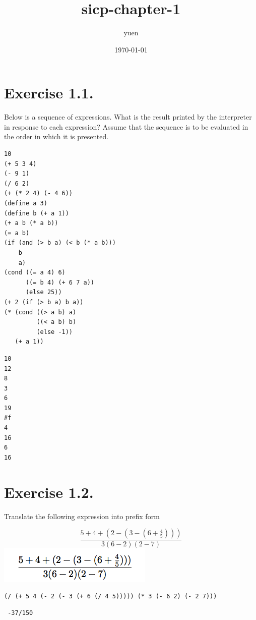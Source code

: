 \documentclass[11pt]{article}
\title{sicp-chapter-1}
\author{yuen}
\date{\today}
\begin{document}
\maketitle

\setcounter{tocdepth}{3}
\tableofcontents
\vspace*{1cm}
\section{Exercise 1.1.}
\label{sec-1}


  Below is a sequence of expressions. What is the result printed by the
  interpreter in response to each expression? Assume that the sequence is
  to be evaluated in the order in which it is presented.


\begin{verbatim}
10
(+ 5 3 4)
(- 9 1)
(/ 6 2)
(+ (* 2 4) (- 4 6))
(define a 3)
(define b (+ a 1))
(+ a b (* a b))
(= a b)
(if (and (> b a) (< b (* a b)))
    b
    a)
(cond ((= a 4) 6)
      ((= b 4) (+ 6 7 a))
      (else 25))
(+ 2 (if (> b a) b a))
(* (cond ((> a b) a)
         ((< a b) b)
         (else -1))
   (+ a 1))
\end{verbatim}


\begin{verbatim}
10
12
8
3
6
19
#f
4
16
6
16
\end{verbatim}
\section{Exercise 1.2.}
\label{sec-2}


  Translate the following expression into prefix form

\begin{equation}
\frac{5 + 4 + (2 - (3 - (6 + \frac{4}{5})))}{3 (6 - 2) (2 - 7)}
\end{equation}
\includegraphics[width=.9\linewidth]{exercise-1.2.png}

\begin{verbatim}
(/ (+ 5 4 (- 2 (- 3 (+ 6 (/ 4 5))))) (* 3 (- 6 2) (- 2 7)))
\end{verbatim}

\begin{verbatim}
 -37/150
\end{verbatim}
\end{document}

